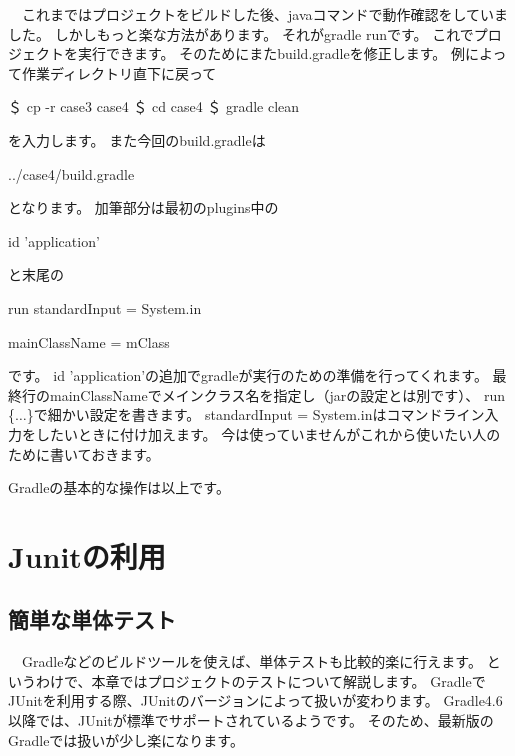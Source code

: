 \documentclass[a4paper,12pt]{article}
\begin{document}
　これまではプロジェクトをビルドした後、javaコマンドで動作確認をしていました。
しかしもっと楽な方法があります。
それがgradle runです。
これでプロジェクトを実行できます。
そのためにまたbuild.gradleを修正します。
例によって作業ディレクトリ直下に戻って
\begin{shell}
＄ cp -r case3 case4
＄ cd case4
＄ gradle clean
\end{shell}
を入力します。
\newpage
また今回のbuild.gradleは
\begin{lstinputlisting}[caption=case4/build.gradle]
	{../case4/build.gradle}
\end{lstinputlisting}
となります。
加筆部分は最初のplugins中の
\begin{java}
id 'application'
\end{java}
と末尾の
\begin{java}
run {
	standardInput = System.in
}

mainClassName = mClass
\end{java}
です。
id 'application'の追加でgradleが実行のための準備を行ってくれます。
最終行のmainClassNameでメインクラス名を指定し（jarの設定とは別です）、
run \{$\ldots$\}で細かい設定を書きます。
standardInput = System.inはコマンドライン入力をしたいときに付け加えます。
今は使っていませんがこれから使いたい人のために書いておきます。

Gradleの基本的な操作は以上です。

\section{Junitの利用}

\subsection{簡単な単体テスト}

　Gradleなどのビルドツールを使えば、単体テストも比較的楽に行えます。
というわけで、本章ではプロジェクトのテストについて解説します。
GradleでJUnitを利用する際、JUnitのバージョンによって扱いが変わります。
Gradle4.6以降では、JUnitが標準でサポートされているようです。
そのため、最新版のGradleでは扱いが少し楽になります。
\end{document}
